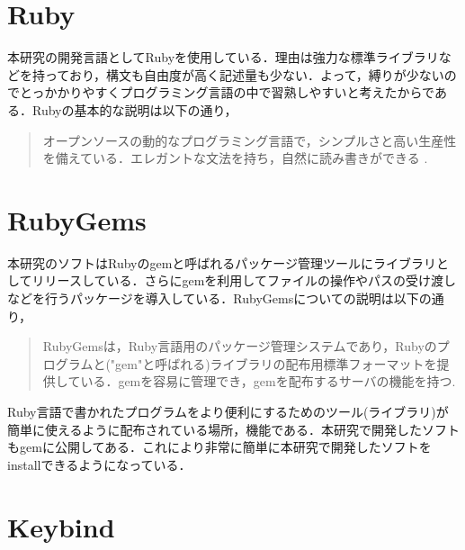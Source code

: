     \section{Ruby}\label{ruby}

本研究の開発言語としてRubyを使用している．理由は強力な標準ライブラリなどを持っており，構文も自由度が高く記述量も少ない．よって，縛りが少ないのでとっかかりやすくプログラミング言語の中で習熟しやすいと考えたからである．Rubyの基本的な説明は以下の通り，
\begin{quotation}
オープンソースの動的なプログラミング言語で，シンプルさと高い生産性を備えている．エレガントな文法を持ち，自然に読み書きができる\cite{ruby} . 
\end{quotation}

    \section{RubyGems}\label{rubygems}

本研究のソフトはRubyのgemと呼ばれるパッケージ管理ツールにライブラリとしてリリースしている．さらにgemを利用してファイルの操作やパスの受け渡しなどを行うパッケージを導入している．RubyGemsについての説明は以下の通り，
\begin{quotation}
RubyGemsは，Ruby言語用のパッケージ管理システムであり，Rubyのプログラムと("gem"と呼ばれる)ライブラリの配布用標準フォーマットを提供している．gemを容易に管理でき，gemを配布するサーバの機能を持つ.  \cite{gems} 
\end{quotation}
Ruby言語で書かれたプログラムをより便利にするためのツール(ライブラリ)が簡単に使えるように配布されている場所，機能である．本研究で開発したソフトもgemに公開してある．これにより非常に簡単に本研究で開発したソフトをinstallできるようになっている．

    \section{Keybind}\label{keybind}

